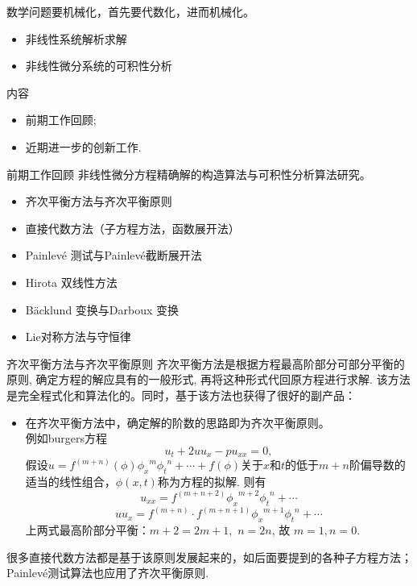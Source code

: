 \documentclass{beamer}
\begin{document}
\begin{frame}
     \mbox{} \hskip 2cm 数学问题要机械化，首先要代数化，进而机械化。\\[3mm]
     \begin{itemize}
     \item 非线性系统解析求解
     \item 非线性微分系统的可积性分析
     \end{itemize}
\end{frame}
\begin{frame}{内容}
\begin{itemize}
  \item 前期工作回顾; 
  \item 近期进一步的创新工作. 
  \end{itemize}
\end{frame}
\begin{frame}{前期工作回顾}
  非线性微分方程精确解的构造算法与可积性分析算法研究。
  \begin{itemize}
    \item 齐次平衡方法与齐次平衡原则\\[1mm]
    \item 直接代数方法（子方程方法，函数展开法）\\[1mm]
    \item Painlev\'e 测试与Painlev\'e截断展开法 \\[1mm]
    \item Hirota 双线性方法 \\[1mm]
    \item B\"acklund 变换与Darboux 变换\\[1mm]
    \item Lie对称方法与守恒律 
  \end{itemize}
\end{frame}
\begin{frame}{齐次平衡方法与齐次平衡原则}
  齐次平衡方法是根据方程最高阶部分可部分平衡的原则, 确定方程的解应具有的一般形式, 再将这种形式代回原方程进行求解. 该方法是完全程式化和算法化的。同时，基于该方法也获得了很好的副产品：
  \begin{itemize}
    \item 在齐次平衡方法中，确定解的阶数的思路即为齐次平衡原则。\\
    例如burgers方程
  \[
    u_t+2uu_x-pu_{xx}=0,
  \]
 假设$u=f^{(m+n)}(\phi){\phi_x}^m{\phi_t}^n+\cdots+f(\phi)$关于$x$和$t$的低于$m+n$阶偏导数的适当的线性组合，$\phi(x,t)$称为方程的拟解. 则有
 \[
   u_{xx}= f^{(m+n+2)}{\phi_x}^{m+2}{\phi_t}^n+\cdots     
\]
  \[
uu_x=f^{(m+n)}\cdot f^{(m+n+1)}{\phi_x}^{m+1}{\phi_t}^n +\cdots  
\]
上两式最高阶部分平衡：$m+2=2m+1,\,\, n=2n$, 故 $m=1,n=0$.
\end{itemize}
很多直接代数方法都是基于该原则发展起来的，如后面要提到的各种子方程方法；Painlev\'{e}测试算法也应用了齐次平衡原则.
\end{frame}
\end{document}
